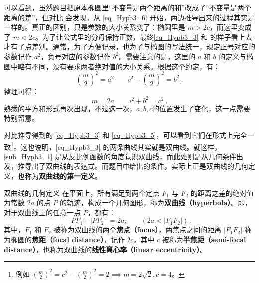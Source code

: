 可以看到，虽然题目把原本椭圆里“不变量是两个距离的和”改成了“不变量是两个距离的差”，但对比  会发现，从 \autoref{eq_Hypb3_6} 开始，两边推导出来的过程其实是一样的。真正的区别，只是参数的大小关系变了：椭圆里是 $m>2c$，而这里变成了 $m<2c$。为了让公式里的分母保持正数，最终\autoref{eq_Hypb3_3} 和  的样子看上去才有了点差别。通常，为了方便记录，也为了与椭圆的写法统一，规定正号对应的参数记作 $a^2$，负号对应的参数记作 $b^2$。需要注意的是，这里的 $a$ 和 $b$ 的定义与椭圆中略有不同，没有要求两者绝对值的大小关系。根据这个约定，有：
\begin{equation}\label{eq_Hypb3_10}
\left(\displaystyle\frac{m}{2}\right)^2=a^2\qquad c^2-\displaystyle\left(\frac{m}{2}\right)^2=b^2~.
\end{equation}
整理可得：
\begin{equation}\label{eq_Hypb3_12}
m=2a\qquad a^2+b^2=c^2~.
\end{equation}
熟悉的平方和形式再次出现，不过这一次，$a,b,c$的位置发生了变化，这一点需要特别留意。

对比推导得到的 \autoref{eq_Hypb3_3} 和 \autoref{eq_Hypb3_5}，可以看到它们在形式上完全一致\footnote{例如 $\displaystyle\left( \frac{m}{2} \right)^2 = c^2 - \left( \frac{m}{2} \right)^2 = 2\implies m = 2\sqrt{2}, c = 4$。}。这也说明，\autoref{eq_Hypb3_3} 的两条曲线其实就是双曲线。就这样，\autoref{sub_Hypb3_1} 是从反比例函数的角度认识双曲线，而此处则是从几何条件出发，推导出了双曲线的表达式。而题目中给出的条件，实际上正是双曲线的几何定义，也称为\textbf{双曲线的第一定义}。

\begin{definition}{双曲线的几何定义}
在平面上，所有满足到两个定点 $F_1$ 与 $F_2$ 的距离之差的绝对值为常数 $2a$ 的点 $P$ 的轨迹，构成一个几何图形，称为\textbf{双曲线（hyperbola）}。即，对于双曲线上的任意一点 $P$，都有：
\begin{equation}
||PF_1| - |PF_2|| = 2a ,\qquad(2a<|F_1F_2|)~.
\end{equation}
其中，$F_1$ 和 $F_2$ 被称为双曲线的两个\textbf{焦点（focus）}，两焦点之间的距离 $|F_1F_2|$ 称为椭圆的\textbf{焦距（focal distance）}，记作 $2c$，其中 $c$ 被称为\textbf{半焦距（semi-focal distance）}，也称为双曲线的\textbf{线性离心率（linear eccentricity）}。
\end{definition}

